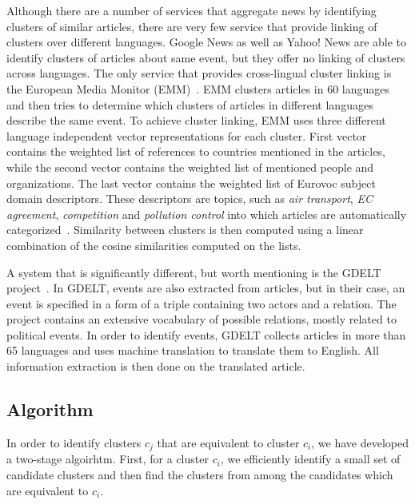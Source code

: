 \documentclass[twoside,11pt]{article}
\begin{document}
Although there are a number of services that aggregate news by identifying clusters of similar articles, there are very few service that provide linking of clusters over different languages. Google News as well as Yahoo! News are able to identify clusters of articles about same event, but they offer no linking of clusters across languages. The only service that provides cross-lingual cluster linking is the European Media Monitor (EMM)~\cite{Steinberger2008}. EMM clusters articles in 60 languages and then tries to determine which clusters of articles in different languages describe the same event. To achieve cluster linking, EMM uses three different language independent vector representations for each cluster. First vector contains the weighted list of references to countries mentioned in the articles, while the second vector contains the weighted list of mentioned people and organizations. The last vector contains the weighted list of Eurovoc subject domain descriptors. These descriptors are topics, such as \emph{air transport}, \emph{EC agreement}, \emph{competition} and \emph{pollution control} into which articles are automatically categorized~\cite{Pouliquen2006}. Similarity between clusters is then computed using a linear combination of the cosine similarities computed on the lists.

A system that is significantly different, but worth mentioning is the GDELT project~\cite{Leetaru2013Gdelt}. In GDELT, events are also extracted from articles, but in their case, an event is specified in a form of a triple containing two actors and a relation. The project contains an extensive vocabulary of possible relations, mostly related to political events. In order to identify events, GDELT collects articles in more than 65 languages and uses machine translation to translate them to English. All information extraction is then done on the translated article.

\subsection{Algorithm}

In order to identify clusters $c_j$ that are equivalent to cluster $c_i$, we have developed a two-stage algoirhtm. First, for a cluster $c_i$, we efficiently identify a small set of candidate clusters and then  find the clusters from among the candidates which are equivalent to $c_i$.
\end{document}
